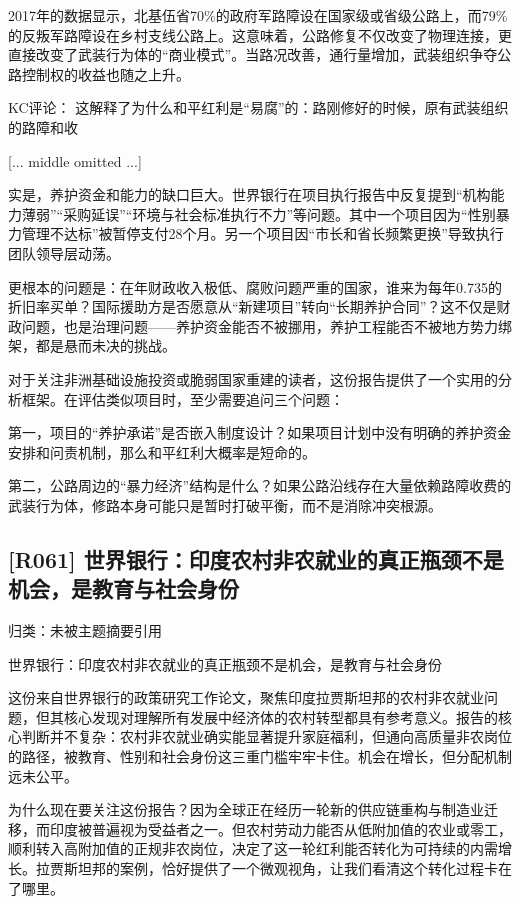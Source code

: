 \documentclass[11pt]{ctexart}
\begin{document}
2017年的数据显示，北基伍省70\%的政府军路障设在国家级或省级公路上，而79\%的反叛军路障设在乡村支线公路上。这意味着，公路修复不仅改变了物理连接，更直接改变了武装行为体的“商业模式”。当路况改善，通行量增加，武装组织争夺公路控制权的收益也随之上升。

KC评论： 这解释了为什么和平红利是“易腐”的：路刚修好的时候，原有武装组织的路障和收

[... middle omitted ...]

实是，养护资金和能力的缺口巨大。世界银行在项目执行报告中反复提到“机构能力薄弱”“采购延误”“环境与社会标准执行不力”等问题。其中一个项目因为“性别暴力管理不达标”被暂停支付28个月。另一个项目因“市长和省长频繁更换”导致执行团队领导层动荡。

更根本的问题是：在年财政收入极低、腐败问题严重的国家，谁来为每年0.735的折旧率买单？国际援助方是否愿意从“新建项目”转向“长期养护合同”？这不仅是财政问题，也是治理问题——养护资金能否不被挪用，养护工程能否不被地方势力绑架，都是悬而未决的挑战。

对于关注非洲基础设施投资或脆弱国家重建的读者，这份报告提供了一个实用的分析框架。在评估类似项目时，至少需要追问三个问题：

第一，项目的“养护承诺”是否嵌入制度设计？如果项目计划中没有明确的养护资金安排和问责机制，那么和平红利大概率是短命的。

第二，公路周边的“暴力经济”结构是什么？如果公路沿线存在大量依赖路障收费的武装行为体，修路本身可能只是暂时打破平衡，而不是消除冲突根源。

\subsection{[R061] 世界银行：印度农村非农就业的真正瓶颈不是机会，是教育与社会身份}
{\small\color{refgray}归类：未被主题摘要引用}

世界银行：印度农村非农就业的真正瓶颈不是机会，是教育与社会身份

这份来自世界银行的政策研究工作论文，聚焦印度拉贾斯坦邦的农村非农就业问题，但其核心发现对理解所有发展中经济体的农村转型都具有参考意义。报告的核心判断并不复杂：农村非农就业确实能显著提升家庭福利，但通向高质量非农岗位的路径，被教育、性别和社会身份这三重门槛牢牢卡住。机会在增长，但分配机制远未公平。

为什么现在要关注这份报告？因为全球正在经历一轮新的供应链重构与制造业迁移，而印度被普遍视为受益者之一。但农村劳动力能否从低附加值的农业或零工，顺利转入高附加值的正规非农岗位，决定了这一轮红利能否转化为可持续的内需增长。拉贾斯坦邦的案例，恰好提供了一个微观视角，让我们看清这个转化过程卡在了哪里。
\end{document}
